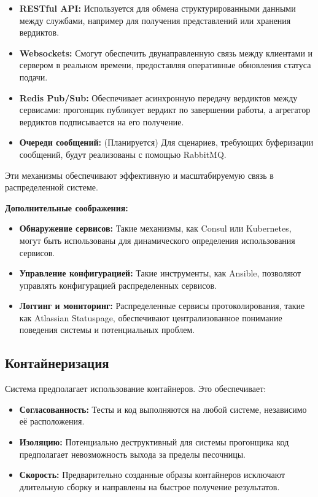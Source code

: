 \begin{itemize}
    \itemsep 0em
    \item \textbf{RESTful API:} \noindent Используется для обмена структурированными данными между службами, например для получения представлений или хранения вердиктов.
    \item \textbf{Websockets:} \noindent Смогут обеспечить двунаправленную связь между клиентами и сервером в реальном времени, предоставляя оперативные обновления статуса подачи.
    \item \textbf{Redis Pub/Sub:} \noindent Обеспечивает асинхронную передачу вердиктов между сервисами: прогонщик публикует вердикт по завершении работы, а агрегатор вердиктов подписывается на его получение.
    \item \textbf{Очереди сообщений:} \noindent (Планируется) Для сценариев, требующих буферизации сообщений, будут реализованы с помощью RabbitMQ.
\end{itemize}
Эти механизмы обеспечивают эффективную и масштабируемую связь в распределенной системе.

\textbf{Дополнительные соображения:}
\begin{itemize}
    \itemsep 0em
    \item \textbf{Обнаружение сервисов:} \noindent Такие механизмы, как Consul или Kubernetes, могут быть использованы для динамического определения использования сервисов.
    \item \textbf{Управление конфигурацией:} \noindent Такие инструменты, как Ansible, позволяют управлять конфигурацией распределенных сервисов.
    \item \textbf{Логгинг и мониторинг:} \noindent Распределенные сервисы протоколирования, такие как Atlassian Statuspage, обеспечивают централизованное понимание поведения системы и потенциальных проблем.
\end{itemize}

\subsection{Контайнеризация}
Система предполагает использование контайнеров. Это обеспечивает:
\begin{itemize}
    \itemsep 0em
    \item \textbf{Согласованность:} \noindent Тесты и код выполняются на любой системе, независимо её расположения.
    \item \textbf{Изоляцию:} \noindent Потенциально деструктивный для системы прогонщика код предполагает невозможность выхода за пределы песочницы. 
    \item \textbf{Скорость:} \noindent Предварительно созданные образы контайнеров исключают длительную сборку и направлены на быстрое получение результатов.
\end{itemize}

